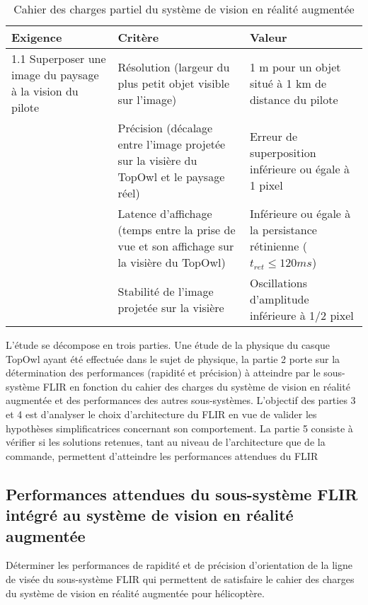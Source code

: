 \begin{table}[!htb]
\begin{center}
\begin{tabular}{|p{}|p{}|p{}|}
\hline 
\textbf{Exigence} & \textbf{Critère} & \textbf{Valeur} \\ 
\hline 
1.1 Superposer une image du paysage à la vision du pilote & Résolution (largeur du plus petit
objet visible sur l'image) & 1 m pour un objet situé à 1 km de
distance du pilote \\ 
\cline{2-3} 
& Précision (décalage entre l'image
projetée sur la visière du TopOwl et
le paysage réel) & Erreur de superposition inférieure
ou égale à 1 pixel\\ 
\cline{2-3}  
 & Latence d'affichage (temps entre la
prise de vue et son affichage sur la
visière du TopOwl) & Inférieure ou égale à la persistance
rétinienne ($t_{ret} \leq 120 ms$) \\ 
\cline{2-3}  
 & Stabilité de l'image projetée sur la
visière & Oscillations d'amplitude inférieure
à 1/2 pixel \\ 
\hline
\end{tabular} 
\caption{Cahier des charges partiel du système de vision en réalité augmentée \label{tab1}}
\end{center}
\end{table}

L'étude se décompose en trois parties. Une étude de la physique du casque TopOwl ayant été effectuée dans
le sujet de physique, la partie 2 porte sur la détermination des performances (rapidité et précision) à atteindre
par le sous-système FLIR en fonction du cahier des charges du système de vision en réalité augmentée et
des performances des autres sous-systèmes. L'objectif des parties 3 et 4 est d'analyser le choix d'architecture du
FLIR en vue de valider les hypothèses simplificatrices concernant son comportement. La partie 5 consiste à
vérifier si les solutions retenues, tant au niveau de l'architecture que de la commande, permettent d'atteindre
les performances attendues du FLIR

\subsection{Performances attendues du sous-système FLIR intégré au système
de vision en réalité augmentée}\label{partie1}

\begin{obj}
Déterminer les performances de rapidité et de précision d'orientation de la ligne de visée du sous-système
FLIR qui permettent de satisfaire le cahier des charges du système de vision en réalité augmentée
pour hélicoptère.
\end{obj}

